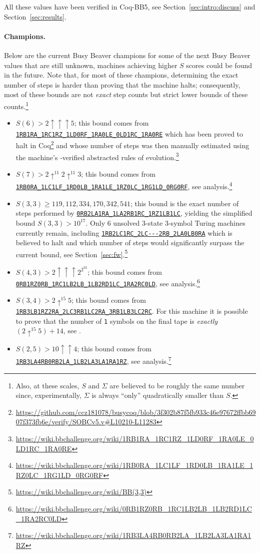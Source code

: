 \documentclass[a4paper,british]{article}
\theoremstyle{definition} %
\numberwithin{equation}{section}
\theoremstyle{definition} %
\newcommand{\tm}[1]{\href{https://bbchallenge.org/#1}{\texttt{\nolinkurl{#1}}}}
\newcommand{\sone}{\texttt{1}\xspace}
\newcommand{\CoqBB}{Coq-BB5\xspace}
\begin{document}
All these values have been verified in \CoqBB, see Section~\ref{sec:intro:discuss} and Section~\ref{sec:results}.

\paragraph{Champions.} Below are the current Busy Beaver champions for some of the next Busy Beaver values that are still unknown, \ie machines achieving higher $S$ scores could be found in the future. Note that, for most of these champions, determining the exact number of steps is harder than proving that the machine halts; consequently, most of these bounds are not \textit{exact} step counts but strict lower bounds of these counts.\footnote{Also, at these scales, $S$ and $\Sigma$ are believed to be roughly the same number since, experimentally, $\Sigma$ is always ``only'' quadratically smaller than $S$.}
\begin{itemize}
    \item $S(6) > 2 \uparrow \uparrow \uparrow 5$; this bound comes from \tm{1RB1RA_1RC1RZ_1LD0RF_1RA0LE_0LD1RC_1RA0RE} which has been proved to halt in Coq\footnote{\url{https://github.com/ccz181078/busycoq/blob/3f302b87f5fb933c46e97672ffbb6907f373fb6e/verify/SOBCv5.v\#L10210-L11283}} and whose number of steps was then manually estimated using the machine's \Coq-verified abstracted rules of evolution.\footnote{\url{https://wiki.bbchallenge.org/wiki/1RB1RA_1RC1RZ_1LD0RF_1RA0LE_0LD1RC_1RA0RE}}
    \item $S(7) > 2 \uparrow^{11} 2 \uparrow^{11} 3$; this bound comes from \tm{1RB0RA_1LC1LF_1RD0LB_1RA1LE_1RZ0LC_1RG1LD_0RG0RF}, see analysis.\footnote{\url{https://wiki.bbchallenge.org/wiki/1RB0RA_1LC1LF_1RD0LB_1RA1LE_1RZ0LC_1RG1LD_0RG0RF}}
    \item $S(3,3) \geq 119{,}112{,}334{,}170{,}342{,}541$; this bound is the exact number of steps performed by \tm{0RB2LA1RA_1LA2RB1RC_1RZ1LB1LC}, yielding the simplified bound $S(3,3) > 10^{17}$. Only 6 unsolved 3-state 3-symbol Turing machines currently remain, including \tm{1RB2LC1RC_2LC---2RB_2LA0LB0RA} which is believed to halt and which number of steps would significantly surpass the current bound, see Section~\ref{sec:fw}.\footnote{\url{https://wiki.bbchallenge.org/wiki/BB(3,3)}}
    \item $S(4,3) > 2 \uparrow \uparrow \uparrow 2^{2^{32}}$; this bound comes from \tm{0RB1RZ0RB_1RC1LB2LB_1LB2RD1LC_1RA2RC0LD}, see analysis.\footnote{\url{https://wiki.bbchallenge.org/wiki/0RB1RZ0RB_1RC1LB2LB_1LB2RD1LC_1RA2RC0LD}}
    \item $S(3,4) > 2 \uparrow^{15} 5$; this bound comes from \tm{1RB3LB1RZ2RA_2LC3RB1LC2RA_3RB1LB3LC2RC}. For this machine it is possible to prove that the number of \sone symbols on the final tape is \textit{exactly} $(2 \uparrow^{15} 5) + 14$, see \cite{ligocki2024bb34ack14}.
    \item $S(2,5) > 10 \uparrow \uparrow 4$; this bound comes from \tm{1RB3LA4RB0RB2LA_1LB2LA3LA1RA1RZ}, see analysis.\footnote{\url{https://wiki.bbchallenge.org/wiki/1RB3LA4RB0RB2LA_1LB2LA3LA1RA1RZ}}
\end{itemize}
\end{document}
